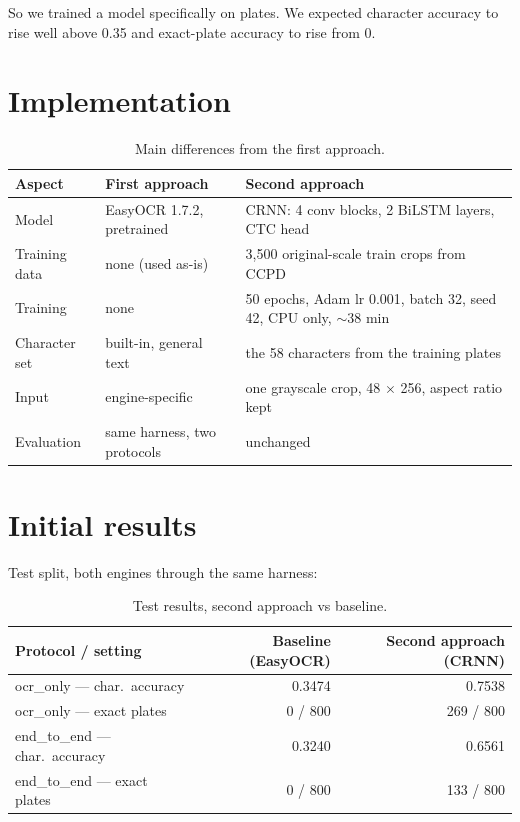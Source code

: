 \documentclass[11pt]{article}
\begin{document}
So we trained a model specifically on plates. We expected character accuracy
to rise well above 0.35 and exact-plate accuracy to rise from 0.

\section{Implementation}

\begin{table}[H]
\centering
\begin{tabular}{@{}lll@{}}
\toprule
Aspect & First approach & Second approach \\
\midrule
Model & EasyOCR 1.7.2, pretrained & CRNN: 4 conv blocks, 2 BiLSTM layers, CTC head \\
Training data & none (used as-is) & 3{,}500 original-scale train crops from CCPD \\
Training & none & 50 epochs, Adam lr 0.001, batch 32, seed 42, CPU only, $\sim$38 min \\
Character set & built-in, general text & the 58 characters from the training plates \\
Input & engine-specific & one grayscale crop, 48 $\times$ 256, aspect ratio kept \\
Evaluation & same harness, two protocols & unchanged \\
\bottomrule
\end{tabular}
\caption{Main differences from the first approach.}
\end{table}

\section{Initial results}

Test split, both engines through the same harness:

\begin{table}[H]
\centering
\begin{tabular}{@{}lrr@{}}
\toprule
Protocol / setting & Baseline (EasyOCR) & Second approach (CRNN) \\
\midrule
ocr\_only --- char.\ accuracy & 0.3474 & 0.7538 \\
ocr\_only --- exact plates & 0 / 800 & 269 / 800 \\
end\_to\_end --- char.\ accuracy & 0.3240 & 0.6561 \\
end\_to\_end --- exact plates & 0 / 800 & 133 / 800 \\
\bottomrule
\end{tabular}
\caption{Test results, second approach vs baseline.}
\end{table}
\end{document}

